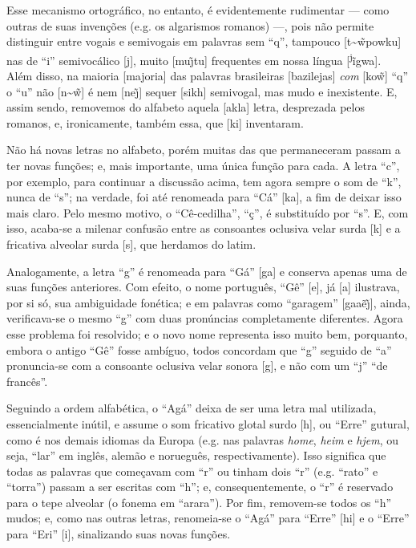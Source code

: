 \documentclass[12pt, a5paper, titlepage]{article}
\newcommand{\textll}{\textsubbar{l}\textsuperscript{j}}
\begin{document}
Esse mecanismo ortográfico, no entanto, é evidentemente rudimentar --- como outras de suas invenções (e.g. os algarismos romanos) ---, pois não permite distinguir entre vogais e semivogais em palavras sem ``q'', tampouco [t\~\textturna\~w\textprimstress powku] nas de ``i'' semivocálico [j], muito [\textprimstress mu\~\j tu] frequentes em nossa língua [\textprimstress\textll ĩgwa]. Além disso, na maioria [majo\textprimstress ria] das palavras brasileiras [b\textfishhookr azi\textprimstress lej\textfishhookr as] \textit{com} [ko\~w] ``q'' o ``u'' não [n\~\textturna\~w] é nem [ne\~\j] sequer [si\textprimstress k\textepsilon h] semivogal, mas mudo e inexistente. E, assim sendo, removemos do alfabeto aquela [a\textprimstress k\textepsilon la] letra, desprezada pelos romanos, e, ironicamente, também essa, que [ki] inventaram.

Não há novas letras no alfabeto, porém muitas das que permaneceram passam a ter
novas funções; e, mais importante, uma única função para cada. A letra ``c'',
por exemplo, para continuar a discussão acima, tem agora sempre o som de ``k'',
nunca de ``s''; na verdade, foi até renomeada para ``Cá'' [ka], a fim de deixar
isso mais claro. Pelo mesmo motivo, o ``Cê-cedilha'', ``ç'', é substituído por
``s''. E, com isso, acaba-se a milenar confusão entre as consoantes oclusiva velar
surda [k] e a fricativa alveolar surda [s], que herdamos do latim.

Analogamente, a letra ``g'' é renomeada para ``Gá'' [ga] e conserva apenas uma de suas funções anteriores. Com efeito, o nome português, ``Gê'' [\textyogh e], já [\textyogh a] ilustrava, por si só, sua ambiguidade fonética; e em palavras como ``garagem'' [ga\textprimstress\textfishhookr a\textyogh \~e\~\j], ainda, verificava-se o mesmo ``g'' com duas pronúncias completamente diferentes. Agora esse problema foi resolvido; e o novo nome representa isso muito bem, porquanto, embora o antigo ``Gê'' fosse ambíguo, todos concordam que ``g'' seguido de ``a'' pronuncia-se com a consoante oclusiva velar sonora [g], e não com um ``j'' ``de francês''.

Seguindo a ordem alfabética, o ``Agá'' deixa de ser uma letra mal utilizada, essencialmente inútil, e assume o som fricativo glotal surdo [h], ou ``Erre'' gutural, como é nos demais idiomas da Europa (e.g. nas palavras \textit{home}, \textit{heim} e \textit{hjem}, ou seja, ``lar'' em inglês, alemão e norueguês, respectivamente). Isso significa que todas as palavras que começavam com ``r'' ou tinham dois ``r'' (e.g. ``rato'' e ``torra'') passam a ser escritas com ``h''; e, consequentemente, o ``r'' é reservado para o tepe alveolar (o fonema em ``arara''). Por fim, removem-se todos os ``h'' mudos; e, como nas outras letras, renomeia-se o ``Agá'' para ``Erre'' [\textprimstress\textepsilon hi] e o ``Erre'' para ``Eri'' [\textprimstress\textepsilon\textfishhookr i], sinalizando suas novas funções.
\end{document}
